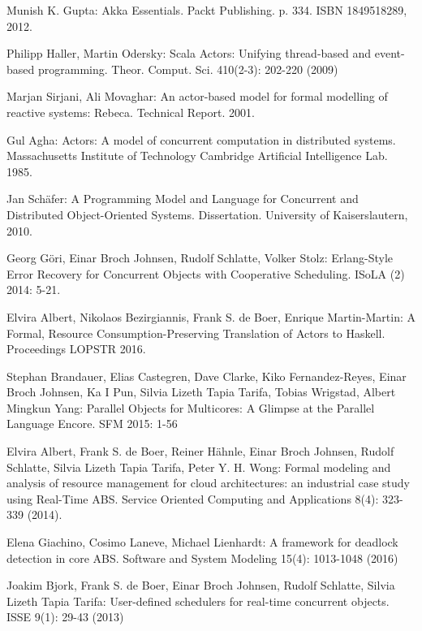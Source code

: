 \documentclass[runningheads,a4paper]{llncs}
\begin{document}
	
	
	
	
	\begin{thebibliography}{4}

  Munish K. Gupta:  Akka Essentials. Packt Publishing. p. 334. ISBN 1849518289, 2012.


 Philipp Haller, Martin Odersky:
Scala Actors: Unifying thread-based and event-based programming. Theor. Comput. Sci. 410(2-3): 202-220 (2009)

 Marjan  Sirjani, Ali Movaghar:
An actor-based model for formal modelling of reactive systems: Rebeca.
Technical Report. 2001.

    Gul Agha: Actors: A model of concurrent computation in distributed systems. Massachusetts Institute of Technology Cambridge Artificial Intelligence Lab.
1985.

 Jan Sch\"{a}fer:  A Programming Model and Language for Concurrent and Distributed Object-Oriented Systems. 
Dissertation. University of Kaiserslautern, 2010. 

Georg G\"{o}ri, Einar Broch Johnsen, Rudolf Schlatte, Volker Stolz:
Erlang-Style Error Recovery for Concurrent Objects with Cooperative Scheduling. ISoLA (2) 2014: 5-21.

 	Elvira Albert, Nikolaos Bezirgiannis, Frank S. de Boer, Enrique Martin-Martin:
A Formal, Resource Consumption-Preserving Translation of Actors to Haskell. 
Proceedings LOPSTR 2016.

Stephan Brandauer, Elias Castegren, Dave Clarke, Kiko Fernandez-Reyes, Einar Broch Johnsen, Ka I Pun, Silvia Lizeth Tapia Tarifa, Tobias Wrigstad, Albert Mingkun Yang:
Parallel Objects for Multicores: A Glimpse at the Parallel Language Encore. SFM 2015: 1-56

	Elvira Albert, Frank S. de Boer, Reiner Hähnle, Einar Broch Johnsen, Rudolf Schlatte, Silvia Lizeth Tapia Tarifa, Peter Y. H. Wong:
Formal modeling and analysis of resource management for cloud architectures: an industrial case study using Real-Time ABS. Service Oriented Computing and Applications 8(4): 323-339 (2014).

Elena Giachino, Cosimo Laneve, Michael Lienhardt:
A framework for deadlock detection in core ABS. Software and System Modeling 15(4): 1013-1048 (2016)


		Joakim Bjork, Frank S. de Boer, Einar Broch Johnsen, Rudolf Schlatte, Silvia Lizeth Tapia Tarifa:
		User-defined schedulers for real-time concurrent objects. ISSE 9(1): 29-43 (2013)
		

\end{thebibliography}
\end{document}
